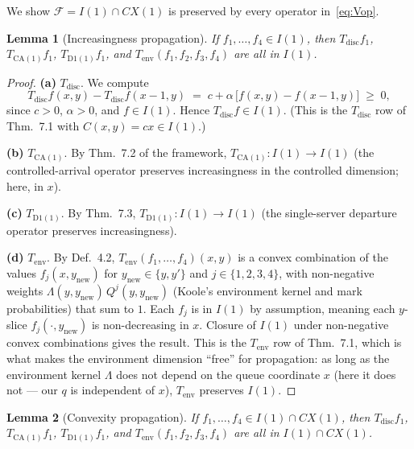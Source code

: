 \documentclass[11pt,a4paper]{article}
\newcommand{\F}{\mathcal{F}}
\newcommand{\Tdisc}{T_{\mathrm{disc}}}
\newcommand{\Tenv}{T_{\mathrm{env}}}
\newcommand{\Tca}{T_{\mathrm{CA}(1)}}
\newcommand{\Td}{T_{\mathrm{D1}(1)}}
\newcommand{\Cx}{CX}
\newcommand{\Iclass}{I}
\newtheorem{lemma}{Lemma}
\theoremstyle{definition}
\begin{document}
We show $\F = \Iclass(1) \cap \Cx(1)$ is preserved by every operator
in~\eqref{eq:Vop}.

\begin{lemma}[Increasingness propagation]
\label{lem:I}
If $f_1, \ldots, f_4 \in \Iclass(1)$, then $\Tdisc f_1$, $\Tca f_1$,
$\Td f_1$, and $\Tenv(f_1, f_2, f_3, f_4)$ are all in $\Iclass(1)$.
\end{lemma}

\begin{proof}
\textbf{(a)} $\Tdisc$. We compute
\[
    \Tdisc f(x, y) - \Tdisc f(x - 1, y)
    \;=\; c + \alpha\, \bigl[f(x, y) - f(x - 1, y)\bigr]
    \;\ge\; 0,
\]
since $c > 0$, $\alpha > 0$, and $f \in \Iclass(1)$. Hence $\Tdisc f
\in \Iclass(1)$. (This is the $\Tdisc$ row of Thm.~7.1 with
$C(x, y) = cx \in \Iclass(1)$.)

\textbf{(b)} $\Tca$. By Thm.~7.2 of the framework, $\Tca : \Iclass(1)
\to \Iclass(1)$ (the controlled-arrival operator preserves
increasingness in the controlled dimension; here, in $x$).

\textbf{(c)} $\Td$. By Thm.~7.3, $\Td : \Iclass(1) \to \Iclass(1)$
(the single-server departure operator preserves increasingness).

\textbf{(d)} $\Tenv$. By Def.~4.2,
$\Tenv(f_1, \ldots, f_4)(x, y)$ is a convex combination of the
values $f_j(x, y_{\mathrm{new}})$ for $y_{\mathrm{new}} \in \{y, y'\}$
and $j \in \{1, 2, 3, 4\}$, with non-negative weights
$\Lambda(y, y_{\mathrm{new}})\, Q^j(y, y_{\mathrm{new}})$ (Koole's
environment kernel and mark probabilities) that sum to $1$. Each
$f_j$ is in $\Iclass(1)$ by assumption, meaning each $y$-slice
$f_j(\cdot, y_{\mathrm{new}})$ is non-decreasing in $x$. Closure of
$\Iclass(1)$ under non-negative convex combinations gives the
result. This is the $\Tenv$ row of Thm.~7.1, which is what makes the
environment dimension ``free'' for propagation: as long as the
environment kernel $\Lambda$ does not depend on the queue coordinate
$x$ (here it does not --- our $q$ is independent of $x$), $\Tenv$
preserves $\Iclass(1)$.
\end{proof}

\begin{lemma}[Convexity propagation]
\label{lem:Cx}
If $f_1, \ldots, f_4 \in \Iclass(1) \cap \Cx(1)$, then $\Tdisc f_1$,
$\Tca f_1$, $\Td f_1$, and $\Tenv(f_1, f_2, f_3, f_4)$ are all in
$\Iclass(1) \cap \Cx(1)$.
\end{lemma}
\end{document}
